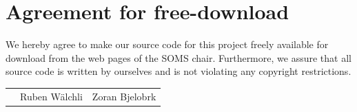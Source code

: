 \documentclass[11pt]{article}
\begin{document}

\newpage


\newpage
\section*{Agreement for free-download}
\bigskip


\bigskip


\large We hereby agree to make our source code for this project freely available for download from the web pages of the SOMS chair. Furthermore, we assure that all source code is written by ourselves and is not violating any copyright restrictions.

\begin{center}

\bigskip


\bigskip


\begin{tabular}{@{}p{3.3cm}@{}p{6cm}@{}@{}p{6cm}@{}}
\begin{minipage}{3cm}

\end{minipage}
&
\begin{minipage}{6cm}
\vspace{2mm} \large Ruben W\"alchli

 \vspace{\baselineskip}

\end{minipage}
&
\begin{minipage}{6cm}

\large Zoran Bjelobrk

\end{minipage}
\end{tabular}


\end{center}
\newpage







\tableofcontents

\newpage

\end{document}
